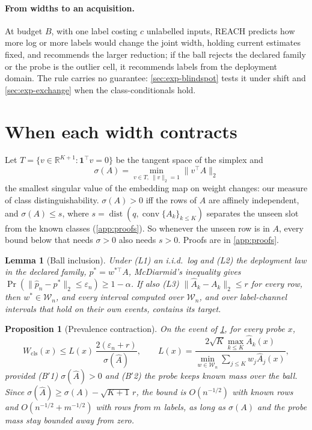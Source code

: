 \documentclass[twoside]{article}
\newcommand{\Wcls}{\ensuremath{W_{\mathrm{cls}}}}
\newtheorem{proposition}{Proposition}
\newtheorem{lemma}{Lemma}
\begin{document}
\paragraph{From widths to an acquisition.} At budget $B$, with one label costing $c$ unlabelled inputs,
REACH predicts how more log or more labels would change the joint width, holding current estimates
fixed, and recommends the larger reduction; if the ball rejects the declared family or the probe is the
outlier cell, it recommends labels from the deployment domain. The rule carries no guarantee:
\cref{sec:exp-blindspot} tests it under shift and \cref{sec:exp-exchange} when the class-conditionals hold.
\section{When each width contracts}
\label{sec:theory}

Let $T=\{v\in\mathbb R^{K+1}:\mathbf 1^{\top}v=0\}$ be the tangent space of the simplex and
\[
\sigma(A)=\min_{v\in T,\ \lVert v\rVert_2=1}\lVert v^{\top}A\rVert_2
\]
the smallest singular value of the embedding map on weight changes: our measure of class
distinguishability. $\sigma(A)>0$ iff the rows of $A$ are affinely independent, and
$\sigma(A)\le s$, where $s=\operatorname{dist}(q,\operatorname{conv}\{A_k\}_{k\le K})$ separates the
unseen slot from the known classes (\cref{app:proofs}). So whenever the unseen row is in $A$, every
bound below that needs $\sigma>0$ also needs $s>0$. Proofs are in \cref{app:proofs}.

\begin{lemma}[Ball inclusion]
\label{lem:ball}
Under (L1) an i.i.d.\ log and (L2) the deployment law in the declared family, $p^{*}=w^{*\top}A$,
McDiarmid's inequality gives $\Pr(\lVert \hat p_n-p^{*}\rVert_2\le\varepsilon_n)\ge 1-\alpha$. If also
(L3) $\lVert\hat A_k-A_k\rVert_2\le r$ for every row, then $w^{*}\in\mathcal W_n$, and every interval
computed over $\mathcal W_n$, and over label-channel intervals that hold on their own events, contains
its target.
\end{lemma}

\begin{proposition}[Prevalence contraction]
\label{prop:bprime}
On the event of \cref{lem:ball}, for every probe $x$,
\[
\Wcls(x)\le L(x)\,\frac{2(\varepsilon_n+r)}{\sigma(\hat A)},\qquad
L(x)=\frac{2\sqrt{K}\max_{k\le K}\hat A_k(x)}{\min_{w\in\mathcal W_n}\sum_{j\le K}w_j\hat A_j(x)},
\]
provided (B$'$1) $\sigma(\hat A)>0$ and (B$'$2) the probe keeps known mass over the ball. Since
$\sigma(\hat A)\ge\sigma(A)-\sqrt{K+1}\,r$, the bound is $O(n^{-1/2})$ with known rows and
$O(n^{-1/2}+m^{-1/2})$ with rows from $m$ labels, as long as $\sigma(A)$ and the probe mass stay
bounded away from zero.
\end{proposition}
\end{document}
